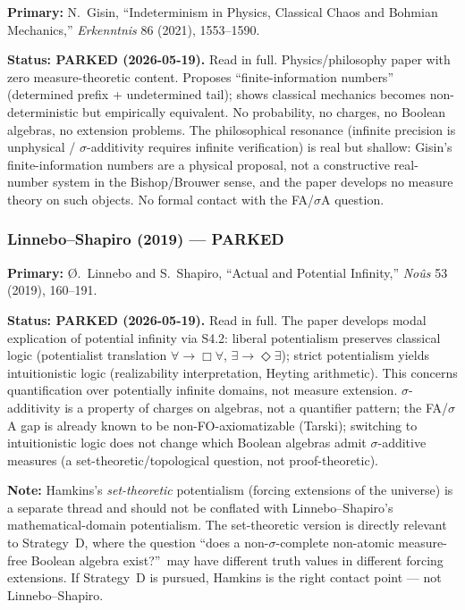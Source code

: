 \noindent\textbf{Primary:} N.~Gisin, ``Indeterminism in
Physics, Classical Chaos and Bohmian Mechanics,'' \emph{Erkenntnis}
86 (2021), 1553--1590.

\medskip\noindent
\textbf{Status: PARKED (2026-05-19).}  Read in full.  Physics/philosophy
paper with zero measure-theoretic content.  Proposes
``finite-information numbers'' (determined prefix + undetermined
tail); shows classical mechanics becomes non-deterministic but
empirically equivalent.  No probability, no charges, no Boolean
algebras, no extension problems.  The philosophical resonance
(infinite precision is unphysical / $\sigma$-additivity requires
infinite verification) is real but shallow: Gisin's
finite-information numbers are a physical proposal, not a
constructive real-number system in the Bishop/Brouwer sense, and
the paper develops no measure theory on such objects.  No formal
contact with the FA/$\sigma$A question.

\subsubsection*{Linnebo--Shapiro (2019) --- PARKED}

\noindent\textbf{Primary:} {\O}.~Linnebo and S.~Shapiro,
``Actual and Potential Infinity,'' \emph{No\^{u}s} 53 (2019),
160--191.

\medskip\noindent
\textbf{Status: PARKED (2026-05-19).}  Read in full.  The paper develops
modal explication of potential infinity via S4.2: liberal
potentialism preserves classical logic (potentialist translation
$\forall \to \Box\forall$, $\exists \to \Diamond\exists$);
strict potentialism yields intuitionistic logic (realizability
interpretation, Heyting arithmetic).  This concerns
quantification over potentially infinite domains, not measure
extension.  $\sigma$-additivity is a property of charges on
algebras, not a quantifier pattern; the FA/$\sigma$A gap is
already known to be non-FO-axiomatizable (Tarski); switching to
intuitionistic logic does not change which Boolean algebras admit
$\sigma$-additive measures (a set-theoretic/topological question,
not proof-theoretic).

\textbf{Note:} Hamkins's \emph{set-theoretic} potentialism
(forcing extensions of the universe) is a separate thread and
should not be conflated with Linnebo--Shapiro's
mathematical-domain potentialism.  The set-theoretic version is
directly relevant to Strategy~D, where the question ``does a
non-$\sigma$-complete non-atomic measure-free Boolean algebra
exist?''\ may have different truth values in different forcing
extensions.  If Strategy~D is pursued, Hamkins is the right
contact point --- not Linnebo--Shapiro.

